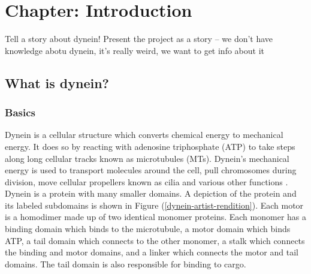 \documentclass[10pt]{article} %
\begin{document}
\tableofcontents
\newpage

\section{Chapter: Introduction}



Tell a story about dynein! Present the project as a story -- we don't have knowledge abotu dynein, it's really weird, we want to get info about it

\subsection{What is dynein?}
\subsubsection{Basics}

Dynein is a cellular structure which converts chemical energy to mechanical energy. It does so by reacting with adenosine triphosphate (ATP) to take steps along long cellular tracks known as microtubules (MTs). Dynein's mechanical energy is used to transport molecules around the cell, pull chromosomes during division, move cellular propellers known as cilia and various other functions \cite{cianfroccoreview}.\\

Dynein is a protein with many smaller domains. A depiction of the protein and its labeled subdomains is shown in Figure (\ref{dynein-artist-rendition}). Each motor is a homodimer made up of two identical monomer proteins. Each monomer has a binding domain which binds to the microtubule, a motor domain which binds ATP, a tail domain which connects to the other monomer, a stalk which connects the binding and motor domains, and a linker which connects the motor and tail domains. The tail domain is also responsible for binding to cargo.\\
\end{document}

